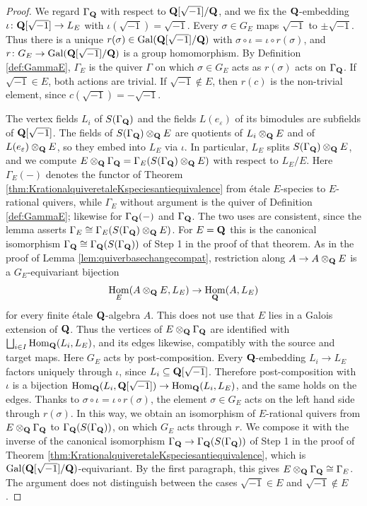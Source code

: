 \documentclass[a4paper,12pt,reqno]{amsart}
\newcommand{\QQ}{{\rm\bf Q}}
\DeclareMathOperator{\Hom}{\mathrm{Hom}}
\DeclareMathOperator{\Gal}{\mathrm {Gal}}
\theoremstyle{plain}
\theoremstyle{remark}
\begin{document}
    \begin{proof}
    We regard $\Gamma_\QQ$ with respect to $\QQ[\sqrt{-1}]/\QQ$, and we fix the $\QQ$-embedding $\iota\colon\QQ[\sqrt{-1}]\to L_E$ with $\iota(\sqrt{-1})=\sqrt{-1}$. Every $\sigma\in G_E$ maps $\sqrt{-1}$ to $\pm\sqrt{-1}$. Thus there is a unique $r(\sigma)\in\Gal(\QQ[\sqrt{-1}]/\QQ)$ with $\sigma\circ\iota=\iota\circ r(\sigma)$, and $r\colon G_E\to\Gal(\QQ[\sqrt{-1}]/\QQ)$ is a group homomorphism. By Definition \ref{def:GammaE}, $\Gamma_E$ is the quiver $\Gamma$ on which $\sigma\in G_E$ acts as $r(\sigma)$ acts on $\Gamma_\QQ$. If $\sqrt{-1}\in E$, both actions are trivial. If $\sqrt{-1}\not\in E$, then $r(c)$ is the non-trivial element, since $c(\sqrt{-1})=-\sqrt{-1}$.

    The vertex fields $L_i$ of $S(\Gamma_\QQ)$ and the fields $L(e_\varepsilon)$ of its bimodules are subfields of $\QQ[\sqrt{-1}]$. The fields of $S(\Gamma_\QQ)\otimes_\QQ E$ are quotients of $L_i\otimes_\QQ E$ and of $L(e_\varepsilon)\otimes_\QQ E$, so they embed into $L_E$ via $\iota$. In particular, $L_E$ splits $S(\Gamma_\QQ)\otimes_\QQ E$, and we compute $E\otimes_\QQ\Gamma_\QQ=\Gamma_E(S(\Gamma_\QQ)\otimes_\QQ E)$ with respect to $L_E/E$. Here $\Gamma_E(-)$ denotes the functor of Theorem \ref{thm:KrationalquiveretaleKspeciesantiequivalence} from \'etale $E$-species to $E$-rational quivers, while $\Gamma_E$ without argument is the quiver of Definition \ref{def:GammaE}; likewise for $\Gamma_\QQ(-)$ and $\Gamma_\QQ$. The two uses are consistent, since the lemma asserts $\Gamma_E\cong\Gamma_E(S(\Gamma_\QQ)\otimes_\QQ E)$. For $E=\QQ$ this is the canonical isomorphism $\Gamma_\QQ\cong\Gamma_\QQ(S(\Gamma_\QQ))$ of Step 1 in the proof of that theorem. As in the proof of Lemma \ref{lem:quiverbasechangecompat}, restriction along $A\to A\otimes_\QQ E$ is a $G_E$-equivariant bijection
    \[
    \Hom_E(A\otimes_\QQ E,L_E)\to\Hom_\QQ(A,L_E)
    \]
    for every finite \'etale $\QQ$-algebra $A$. This does not use that $E$ lies in a Galois extension of $\QQ$. Thus the vertices of $E\otimes_\QQ\Gamma_\QQ$ are identified with $\bigsqcup_{i\in I}\Hom_\QQ(L_i,L_E)$, and its edges likewise, compatibly with the source and target maps. Here $G_E$ acts by post-composition. Every $\QQ$-embedding $L_i\to L_E$ factors uniquely through $\iota$, since $L_i\subseteq\QQ[\sqrt{-1}]$. Therefore post-composition with $\iota$ is a bijection $\Hom_\QQ(L_i,\QQ[\sqrt{-1}])\to\Hom_\QQ(L_i,L_E)$, and the same holds on the edges. Thanks to $\sigma\circ\iota=\iota\circ r(\sigma)$, the element $\sigma\in G_E$ acts on the left hand side through $r(\sigma)$. In this way, we obtain an isomorphism of $E$-rational quivers from $E\otimes_\QQ\Gamma_\QQ$ to $\Gamma_\QQ(S(\Gamma_\QQ))$, on which $G_E$ acts through $r$. We compose it with the inverse of the canonical isomorphism $\Gamma_\QQ\to\Gamma_\QQ(S(\Gamma_\QQ))$ of Step 1 in the proof of Theorem \ref{thm:KrationalquiveretaleKspeciesantiequivalence}, which is $\Gal(\QQ[\sqrt{-1}]/\QQ)$-equivariant. By the first paragraph, this gives $E\otimes_\QQ\Gamma_\QQ\cong\Gamma_E$. The argument does not distinguish between the cases $\sqrt{-1}\in E$ and $\sqrt{-1}\not\in E$.


\end{proof}
\end{document}

